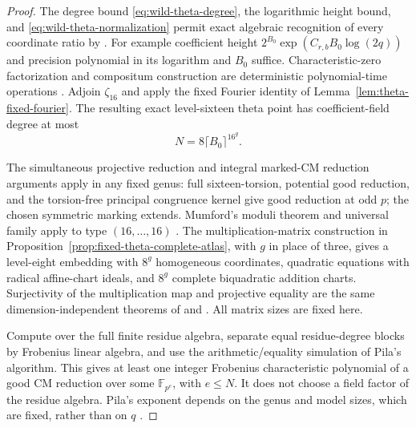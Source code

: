 \documentclass[11pt]{article}
\theoremstyle{definition}
\theoremstyle{remark}
\begin{document}
\begin{proof}
The degree bound \eqref{eq:wild-theta-degree}, the logarithmic height bound, and \eqref{eq:wild-theta-normalization}
permit exact algebraic recognition of every coordinate ratio
by \citet[Theorem~1.19, p.~241]{KannanLenstraLovasz1988}.
For example coefficient height
\(2^{B_0}\exp(C_{r,b}B_0\log(2q))\) and precision polynomial
in its logarithm and \(B_0\) suffice. Characteristic-zero
factorization and compositum construction are deterministic
polynomial-time operations
\citep[Theorem~4.5, pp.~253--254]{Lenstra1983}.
Adjoin \(\zeta_{16}\) and apply the fixed Fourier identity
of Lemma~\ref{lem:theta-fixed-fourier}. The resulting exact
level-sixteen theta point has coefficient-field degree at most
\begin{equation}
                         N=8\lceil B_0\rceil^{16^g}.
 \label{eq:wild-coefficient-degree}
\end{equation}

The simultaneous projective reduction and integral marked-CM
reduction arguments apply in any fixed genus: full
sixteen-torsion, potential good reduction, and the torsion-free
principal congruence kernel give good reduction at odd \(p\);
the chosen symmetric marking extends. Mumford's moduli theorem
and universal family apply to type \((16,\ldots,16)\)
\citep[pp.~83--84,92--94]{Mumford1967}.
The multiplication-matrix construction in
Proposition~\ref{prop:fixed-theta-complete-atlas}, with \(g\)
in place of three, gives a level-eight embedding with
\(8^g\) homogeneous coordinates, quadratic equations with
radical affine-chart ideals, and \(8^g\) complete biquadratic
addition charts. Surjectivity of the multiplication map and
projective equality are the same dimension-independent
theorems of \citet[pp.~324,330,338--341]{Mumford1966} and
\citet[p.~94]{Mumford1967}. All matrix sizes are fixed here.

Compute over the full finite residue algebra, separate equal
residue-degree blocks by Frobenius linear algebra, and use the
arithmetic/equality simulation of Pila's algorithm. This gives
at least one integer Frobenius characteristic polynomial of a
good CM reduction over some \(\mathbb F_{p^e}\), with
\(e\leq N\). It does not choose a field factor of the residue
algebra. Pila's exponent depends on the genus and model sizes,
which are fixed, rather than on \(q\)
\citep[Theorem~A, p.~1; Section~4, pp.~8--14]{Pila1990}.


\end{proof}
\end{document}

